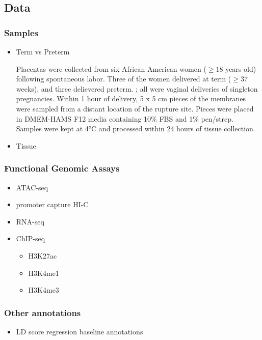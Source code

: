 \subsection{Data}\label{sec:org702e301}
\subsubsection{Samples}\label{sec:orgbbced86}
\begin{itemize}
\item Term vs Preterm  \label{sec:org84e798f}
  
Placentas were collected from six African American women (\(\geq 18\) years old) following spontaneous labor.
Three of the women delivered at term (\(\geq 37\) weeks), and three delievered preterm.
; all were vaginal deliveries of singleton pregnancies. 
Within 1 hour of delivery, 5 x 5 cm pieces of the membranes were sampled from a distant location of the rupture site. Pieces were placed in DMEM-HAMS F12 media containing 10\% FBS and 1\% pen/strep.
 Samples were kept at 4°C and processed within 24 hours of tissue collection. 

\item Tissue\label{sec:org5ff2260}
\end{itemize}
\subsubsection{Functional Genomic Assays}\label{sec:org6fc5644}
\begin{itemize}
\item ATAC-seq
\item promoter capture HI-C
\item RNA-seq
\item ChIP-seq
\begin{itemize}
\item H3K27ac
\item H3K4me1
\item H3K4me3
\end{itemize}
\end{itemize}


\subsubsection{Other annotations}\label{sec:org4f58a59}


\begin{itemize}
\item LD score regression baseline annotations\label{sec:org97696e5}
\end{itemize}

